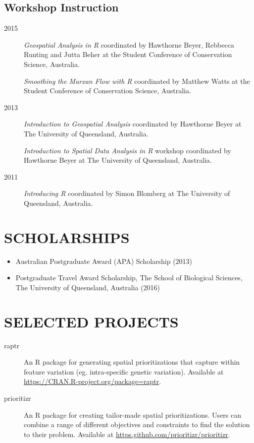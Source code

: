 \documentclass[12pt,a4paper]{article}
\begin{document}
\subsection*{Workshop Instruction}
\begin{description}

\item[2015] \textit{Geospatial Analysis in R} coordinated by Hawthorne Beyer, Rebbecca Runting and Jutta Beher at the Student Conference of Conservation Science, Australia.

\item[] \textit{Smoothing the Marxan Flow with R} coordinated by Matthew Watts at the Student Conference of Conservation Science, Australia.

\item[2013] \textit{Introduction to Geospatial Analysis} coordinated by Hawthorne Beyer at The University of Queensland, Australia.

\item[] \textit{Introduction to Spatial Data Analysis in R} workshop coordinated by Hawthorne Beyer at The University of Queensland, Australia.

\item[2011] \textit{Introducing R} coordinated by Simon Blomberg at The University of Queensland, Australia.

\end{description}

\section*{SCHOLARSHIPS}
\begin{itemize}

\item Australian Postgraduate Award (APA) Scholarship (2013)

\item Postgraduate Travel Award Scholarship, The School of Biological Sciences, The University of Queensland, Australia (2016)

\end{itemize}

\section*{SELECTED PROJECTS}
\begin{description}

\item[raptr] An R package for generating spatial prioritizations that capture within feature variation (eg. intra-specific genetic variation). Available at \url{https://CRAN.R-project.org/package=raptr}.

\item[prioritizr] An R package for creating tailor-made spatial prioritizations. Users can combine a range of different objectives and constraints to find the solution to their problem. Available at \url{https.github.com/prioritizr/prioritizr}.

\end{description}
\end{document}
